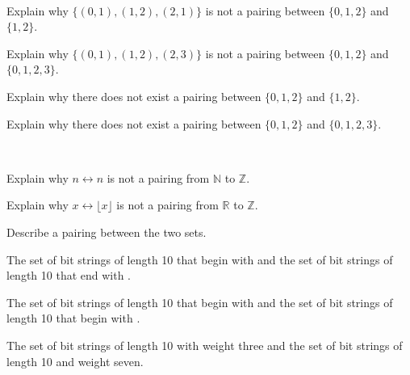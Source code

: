 \begin{exer}[\exerP] %
\label{exer_why_not_pairing_finite}
~
    \begin{apart}
        \item Explain why $\{(0,1),(1,2),(2,1)\}$ is not a pairing between $\{0,1,2\}$ and $\{1,2\}$.
        \item Explain why $\{(0,1),(1,2),(2,3)\}$ is not a pairing between $\{0,1,2\}$ and $\{0,1,2,3\}$.
        \item Explain why there does not exist a pairing between $\{0,1,2\}$ and $\{1,2\}$. 
        \item Explain why there does not exist a pairing between $\{0,1,2\}$ and $\{0,1,2,3\}$. 
    \end{apart}
\end{exer}

\begin{exer}[\exerP] %
\label{exer_why_not_pairing_infinite}
~
    \begin{apart}
        \item Explain why $n \leftrightarrow n$ is not a pairing from $\mathbb{N}$ to $\mathbb{Z}$.
        \item Explain why $x \leftrightarrow \lfloor x \rfloor$ is not a pairing from $\mathbb{R}$ to $\mathbb{Z}$.
    \end{apart}
\end{exer}

\begin{exer}[\exerU] %
\label{exer_bit string pairings}
    Describe a pairing between the two sets.
        \begin{apart}
            \item The set of bit strings of length 10 that begin with  and the set of bit strings of length 10 that end with .
            \item The set of bit strings of length 10 that begin with  and the set of bit strings of length 10 that begin with .
            \item The set of bit strings of length 10 with weight three and the set of bit strings of length 10 and weight seven.
        \end{apart}
\end{exer}

